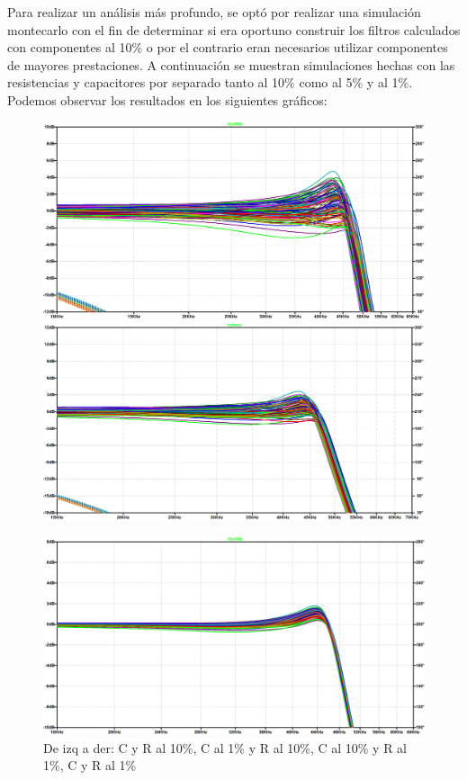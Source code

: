 \documentclass[../../ASSD_TP1_G7.tex]{subfiles}
\begin{document}
Para realizar un análisis más profundo, se optó por realizar una simulación
montecarlo con el fin de determinar si era oportuno construir los
filtros calculados con componentes al 10\% o por el contrario eran
necesarios utilizar componentes de mayores prestaciones. A continuación
se muestran simulaciones hechas con las resistencias y capacitores
por separado tanto al 10\% como al 5\% y al 1\%. Podemos observar
los resultados en los siguientes gráficos:

\begin{figure}[H]
\begin{center}

\includegraphics[scale=0.27]{Imagenes/CyR_al_5.PNG}\includegraphics[scale=0.27]{Imagenes/C_al_1_yR_al_5.PNG}

\includegraphics[scale=0.27]{Imagenes/CyR_al_1.PNG}

\par\end{center}
\caption{De izq a der: C y R al 10\%, C al 1\% y R al 10\%, C al 10\% y R al 1\%, C y R al 1\%}
\end{figure}
\end{document}
